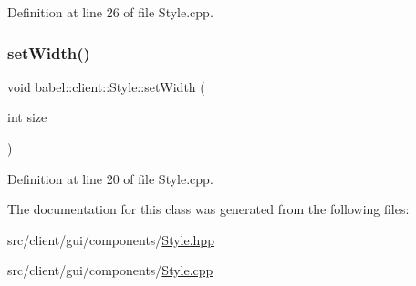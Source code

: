 Definition at line 26 of file Style.\+cpp.

\mbox{\label{classbabel_1_1client_1_1_style_a911d73615b56dcab495fb7a5d561fcf2}} 
\subsubsection{\texorpdfstring{set\+Width()}{setWidth()}}
{\footnotesize\ttfamily void babel\+::client\+::\+Style\+::set\+Width (\begin{DoxyParamCaption}\item[{int}]{size }\end{DoxyParamCaption})}



Definition at line 20 of file Style.\+cpp.



The documentation for this class was generated from the following files\+:\begin{DoxyCompactItemize}
\item 
src/client/gui/components/\mbox{\hyperlink{_style_8hpp}{Style.\+hpp}}\item 
src/client/gui/components/\mbox{\hyperlink{_style_8cpp}{Style.\+cpp}}\end{DoxyCompactItemize}
